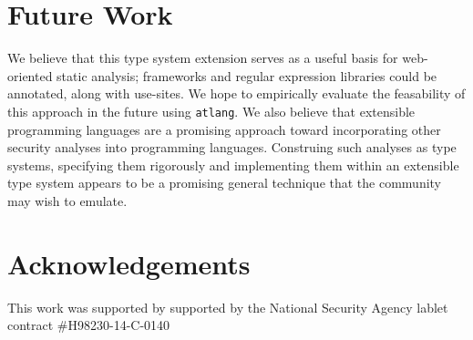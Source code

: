 \documentclass[9pt]{sig-alternate}
\theoremstyle{definition}
\begin{document}

\section{Future Work}

We believe that this type system extension serves as a useful basis for web-oriented static analysis;
frameworks and regular expression libraries could be annotated, along with use-sites. We hope to empirically evaluate the feasability of this approach in the future using \verb|atlang|. 
%
We also believe that extensible programming languages are a promising approach toward incorporating other security
 analyses into programming languages. Construing such analyses as type systems, specifying them rigorously and implementing them within an extensible type system appears to be a promising general technique that the community may wish to emulate.
%



\section{Acknowledgements}
This work was supported by supported by the National Security Agency
lablet contract \#H98230-14-C-0140
\end{document}
